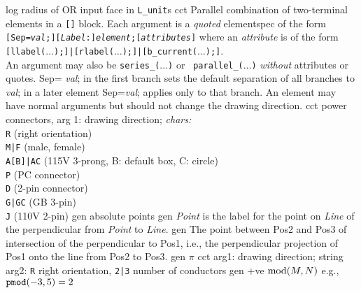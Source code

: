 %
  {log}%
  {radius of OR input face in {\tt L\_unit}s}%
%
%
%
  {cct}%
  { Parallel combination of two-terminal elements in a {\tt []} block.
    Each argument is a {\em quoted} elementspec of the form\\
    {\tt[Sep={\sl val};][{\sl Label}:]{\sl element};[{\sl attributes}]} where
    an {\sl attribute} is of the form\\
    {\tt[llabel($\ldots$);]|[rlabel($\ldots$);]|[b\_current($\ldots$);]}.\\
    An argument may also be {\tt series\_($\ldots$)} or {\tt
    parallel\_($\ldots$)} {\em without} attributes or quotes.  Sep={\sl
    val}; in the first branch sets the default separation of all branches
    to {\sl val}; in a later element Sep={\sl val}; applies only to
    that branch.  An element may have normal arguments but should not
    change the drawing direction.
   }%
%
  {cct}%
  {power connectors, arg 1: drawing direction; {\sl chars:}\\
   {\tt R} (right orientation)\\
   {\tt M|F} (male, female)\\
   {\tt A[B]|AC} (115V 3-prong, B: default box, C: circle)\\
   {\tt P} (PC connector)\\
   {\tt D} (2-pin connector)\\
   {\tt G|GC} (GB 3-pin)\\
   {\tt J} (110V 2-pin)
    }%
%
  {gen}%
  {absolute points}%
%
  {gen}%
  {{\sl Point} is the label for the point on {\sl Line} of the
  perpendicular
   from {\sl Point} to {\sl Line}.}%
%
  {gen}%
  {The point between Pos2 and Pos3 of intersection of the perpendicular
   to Pos1, i.e., the perpendicular projection of Pos1 onto the line
   from Pos2 to Pos3.}%
%
  {gen}%
  {$\pi$}%
%
  {cct}%
  {arg1: drawing direction; string arg2: {\tt R} right orientation,
   {\tt 2|3} number of conductors }%
%
  {gen}%
  {+ve $\hbox{mod}(M,N)$ e.g., $\hbox{\tt pmod}(-3,5)=2$}%
%
